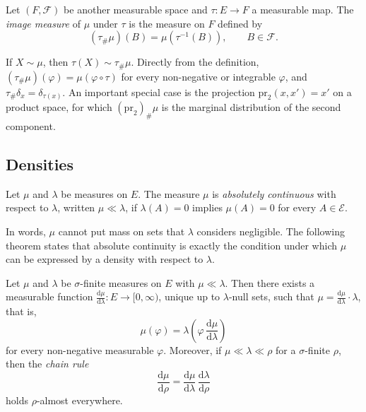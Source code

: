 \begin{definition}
    \label{def:image_measure}
    Let $(F,\mathcal{F})$ be another measurable space and $\tau\colon E\to F$ a measurable map. The \emph{image measure} of $\mu$ under $\tau$ is the measure on $F$ defined by
    \begin{equation}
        (\tau_\#\mu)(B) = \mu\left(\tau^{-1}(B)\right), \qquad B\in\mathcal{F}.
    \end{equation}
\end{definition}
If $X\sim\mu$, then $\tau(X)\sim\tau_\#\mu$. Directly from the definition, $(\tau_\#\mu)(\varphi) = \mu(\varphi\circ\tau)$ for every non-negative or integrable $\varphi$, and $\tau_\#\delta_x = \delta_{\tau(x)}$. An important special case is the projection $\mathrm{pr}_2(x,x') = x'$ on a product space, for which $(\mathrm{pr}_2)_\#\mu$ is the marginal distribution of the second component.

\subsection{Densities}
\begin{definition}
    \label{def:absolute_continuity}
    Let $\mu$ and $\lambda$ be measures on $E$. The measure $\mu$ is \emph{absolutely continuous} with respect to $\lambda$, written $\mu\ll\lambda$, if $\lambda(A)=0$ implies $\mu(A)=0$ for every $A\in\mathcal{E}$.
\end{definition}
In words, $\mu$ cannot put mass on sets that $\lambda$ considers negligible. The following theorem states that absolute continuity is exactly the condition under which $\mu$ can be expressed by a density with respect to $\lambda$.

\begin{theorem}
    \label{thm:radon_nikodym}
    Let $\mu$ and $\lambda$ be $\sigma$-finite measures on $E$ with $\mu\ll\lambda$. Then there exists a measurable function $\frac{\mathrm{d}\mu}{\mathrm{d}\lambda}\colon E\to[0,\infty)$, unique up to $\lambda$-null sets, such that $\mu = \frac{\mathrm{d}\mu}{\mathrm{d}\lambda}\cdot\lambda$, that is,
    \begin{equation}
        \mu(\varphi) = \lambda\left(\varphi\,\frac{\mathrm{d}\mu}{\mathrm{d}\lambda}\right)
    \end{equation}
    for every non-negative measurable $\varphi$. Moreover, if $\mu\ll\lambda\ll\rho$ for a $\sigma$-finite $\rho$, then the \emph{chain rule}
    \begin{equation}
        \frac{\mathrm{d}\mu}{\mathrm{d}\rho} = \frac{\mathrm{d}\mu}{\mathrm{d}\lambda}\,\frac{\mathrm{d}\lambda}{\mathrm{d}\rho}
    \end{equation}
    holds $\rho$-almost everywhere.
\end{theorem}

